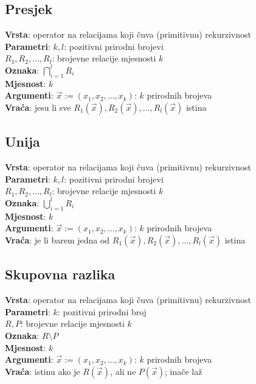 \subsection{Presjek}
\textbf{Vrsta}: operator na relacijama koji čuva (primitivnu) rekurzivnost\\
\textbf{Parametri}: $k,l$: pozitivni prirodni brojevi\\
$R_1,R_2,\dots,R_l$: brojevne relacije mjesnosti $k$\\
\textbf{Oznaka}: $\bigcap_{i=1}^l R_i$\\
\textbf{Mjesnost}: $k$\\
\textbf{Argumenti}: $\vec x:=(x_1,x_2,\dots,x_k)$: $k$ prirodnih brojeva\\
\textbf{Vraća}: jesu li sve $R_1(\vec x),R_2(\vec x),\dots,R_l(\vec x)$ istina

\subsection{Unija}
\textbf{Vrsta}: operator na relacijama koji čuva (primitivnu) rekurzivnost\\
\textbf{Parametri}: $k,l$: pozitivni prirodni brojevi\\
$R_1,R_2,\dots,R_l$: brojevne relacije mjesnosti $k$\\
\textbf{Oznaka}: $\bigcup_{i=1}^l R_i$\\
\textbf{Mjesnost}: $k$\\
\textbf{Argumenti}: $\vec x:=(x_1,x_2,\dots,x_k)$: $k$ prirodnih brojeva\\
\textbf{Vraća}: je li barem jedna od $R_1(\vec x),R_2(\vec x),\dots,R_l(\vec x)$ istina

\subsection{Skupovna razlika}
\textbf{Vrsta}: operator na relacijama koji čuva (primitivnu) rekurzivnost\\
\textbf{Parametri}: $k$: pozitivni prirodni broj\\
$R,P$: brojevne relacije mjesnosti $k$\\
\textbf{Oznaka}: $R\setminus P$\\
\textbf{Mjesnost}: $k$\\
\textbf{Argumenti}: $\vec x:=(x_1,x_2,\dots,x_k)$: $k$ prirodnih brojeva\\
\textbf{Vraća}: istinu ako je $R(\vec x)$, ali ne $P(\vec x)$; inače laž

